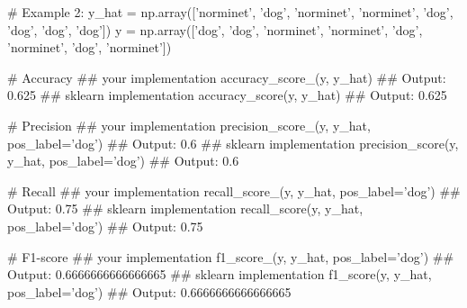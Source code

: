\documentclass[]{article}
\newenvironment{Shaded}{\begin{snugshade}}{\end{snugshade}}
\newcommand{\CommentTok}[1]{\textcolor[rgb]{0.48,0.49,0.49}{#1}}
\newcommand{\FloatTok}[1]{\textcolor[rgb]{0.96,0.45,0.00}{#1}}
\newcommand{\NormalTok}[1]{\textcolor[rgb]{0.81,0.81,0.76}{#1}}
\newcommand{\OperatorTok}[1]{\textcolor[rgb]{0.81,0.81,0.76}{#1}}
\newcommand{\StringTok}[1]{\textcolor[rgb]{0.96,0.31,0.31}{#1}}
\begin{document}
\begin{Shaded}
\begin{Highlighting}[]
\CommentTok{# Example 2:}
\NormalTok{y_hat }\OperatorTok{=}\NormalTok{ np.array([}\StringTok{'norminet'}\NormalTok{, }\StringTok{'dog'}\NormalTok{, }\StringTok{'norminet'}\NormalTok{, }\StringTok{'norminet'}\NormalTok{, }\StringTok{'dog'}\NormalTok{, }\StringTok{'dog'}\NormalTok{, }\StringTok{'dog'}\NormalTok{, }\StringTok{'dog'}\NormalTok{])}
\NormalTok{y }\OperatorTok{=}\NormalTok{ np.array([}\StringTok{'dog'}\NormalTok{, }\StringTok{'dog'}\NormalTok{, }\StringTok{'norminet'}\NormalTok{, }\StringTok{'norminet'}\NormalTok{, }\StringTok{'dog'}\NormalTok{, }\StringTok{'norminet'}\NormalTok{, }\StringTok{'dog'}\NormalTok{, }\StringTok{'norminet'}\NormalTok{])}

\CommentTok{# Accuracy}
\CommentTok{## your implementation}
\NormalTok{accuracy_score_(y, y_hat)}
\CommentTok{## Output:}
\FloatTok{0.625}
\CommentTok{## sklearn implementation}
\NormalTok{accuracy_score(y, y_hat)}
\CommentTok{## Output:}
\FloatTok{0.625}

\CommentTok{# Precision}
\CommentTok{## your implementation}
\NormalTok{precision_score_(y, y_hat, pos_label}\OperatorTok{=}\StringTok{'dog'}\NormalTok{)}
\CommentTok{## Output:}
\FloatTok{0.6}
\CommentTok{## sklearn implementation}
\NormalTok{precision_score(y, y_hat, pos_label}\OperatorTok{=}\StringTok{'dog'}\NormalTok{)}
\CommentTok{## Output:}
\FloatTok{0.6}

\CommentTok{# Recall}
\CommentTok{## your implementation}
\NormalTok{recall_score_(y, y_hat, pos_label}\OperatorTok{=}\StringTok{'dog'}\NormalTok{)}
\CommentTok{## Output:}
\FloatTok{0.75}
\CommentTok{## sklearn implementation}
\NormalTok{recall_score(y, y_hat, pos_label}\OperatorTok{=}\StringTok{'dog'}\NormalTok{)}
\CommentTok{## Output:}
\FloatTok{0.75}

\CommentTok{# F1-score}
\CommentTok{## your implementation}
\NormalTok{f1_score_(y, y_hat, pos_label}\OperatorTok{=}\StringTok{'dog'}\NormalTok{)}
\CommentTok{## Output:}
\FloatTok{0.6666666666666665}
\CommentTok{## sklearn implementation}
\NormalTok{f1_score(y, y_hat, pos_label}\OperatorTok{=}\StringTok{'dog'}\NormalTok{)}
\CommentTok{## Output:}
\FloatTok{0.6666666666666665}
\end{Highlighting}
\end{Shaded}
\end{document}
